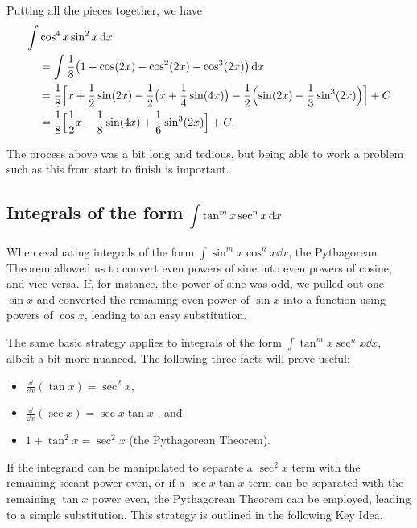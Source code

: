 \begin{example}
Putting all the pieces together, we have
\begin{align*}
	\int &\cos^4x\sin^2x\operatorname{d}\! x \\
	&=\int \frac18\bigl(1+\cos(2x)-\cos^2(2x)-\cos^3(2x)\bigr)\operatorname{d}\! x \\
	&= \frac18
	\Bigl[x+\frac12\sin(2x)-\frac12\bigl(x+\frac14\sin(4x)\bigr)
	-\frac12\Bigl(\sin(2x)-\frac13\sin^3(2x)\Bigr)\Bigr]
	+C \\
	&=\frac18\Bigl[\frac12x-\frac18\sin(4x)+\frac16\sin^3(2x)\Bigr]+C.
\end{align*}
\end{example}

The process above was a bit long and tedious, but being able to work a problem such as this from start to finish is important.

\subsection{Integrals of the form \texorpdfstring{$\displaystyle\int\tan^mx\sec^nx\operatorname{d}\! x$}{∫(tan x)\^{}m (sec x)\^{}n dx}}

When evaluating integrals of the form $\int \sin^mx\cos^nx\dd x$, the Pythagorean Theorem allowed us to convert even powers of sine into even powers of cosine, and vice versa. If, for instance, the power of sine was odd, we pulled out one $\sin x$ and converted the remaining even power of $\sin x$ into a function using powers of $\cos x$, leading to an easy substitution.

The same basic strategy applies to integrals of the form $\int \tan^mx\sec^n x\dd x$, albeit a bit more nuanced. The following three facts will prove useful:
\begin{itemize}
\item $\frac{\dd}{\dd x}(\tan x) = \sec^2x$, 
\item $\frac{\dd}{\dd x}(\sec x) = \sec x\tan x$ , and 
\item	$1+\tan^2x = \sec^2x$ (the Pythagorean Theorem).
\end{itemize}

If the integrand can be manipulated to separate a $\sec^2x$ term with the remaining secant power even, or if a $\sec x\tan x$ term can be separated with the remaining $\tan x$ power even, the Pythagorean Theorem can be employed, leading to a simple substitution. This strategy is outlined in the following Key Idea.

